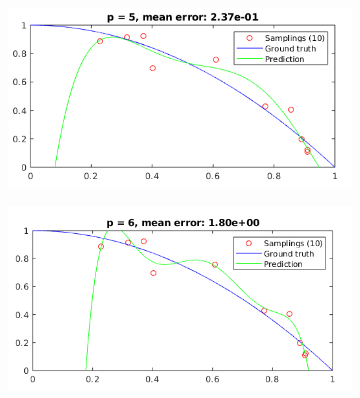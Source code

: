 \documentclass[12pt]{article}
\begin{document}
\begin{figure}[H]
  \centering
  \begin{subfigure}{0.45\textwidth}
    \includegraphics[width=\textwidth]{plots/regression/p_eq_5.png}
  \end{subfigure}
  \begin{subfigure}{0.45\textwidth}
    \includegraphics[width=\textwidth]{plots/regression/p_eq_6.png}
  \end{subfigure}
\end{figure}
\end{document}
